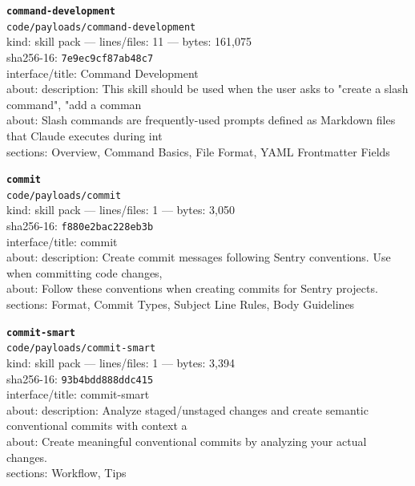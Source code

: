 \noindent\textbf{\texttt{command-development}}\\
\texttt{code/payloads/command-development}\\
kind: skill pack --- lines/files: 11 --- bytes: 161,075\\
sha256-16: \texttt{7e9ec9cf87ab48c7}\\
interface/title: Command Development\\
about: description: This skill should be used when the user asks to "create a slash command", "add a comman\\
about: Slash commands are frequently-used prompts defined as Markdown files that Claude executes during int\\
sections: Overview, Command Basics, File Format, YAML Frontmatter Fields\\
\vspace*{6.0pt}

\noindent\textbf{\texttt{commit}}\\
\texttt{code/payloads/commit}\\
kind: skill pack --- lines/files: 1 --- bytes: 3,050\\
sha256-16: \texttt{f880e2bac228eb3b}\\
interface/title: commit\\
about: description: Create commit messages following Sentry conventions. Use when committing code changes, \\
about: Follow these conventions when creating commits for Sentry projects.\\
sections: Format, Commit Types, Subject Line Rules, Body Guidelines\\
\vspace*{6.0pt}

\noindent\textbf{\texttt{commit-smart}}\\
\texttt{code/payloads/commit-smart}\\
kind: skill pack --- lines/files: 1 --- bytes: 3,394\\
sha256-16: \texttt{93b4bdd888ddc415}\\
interface/title: commit-smart\\
about: description: Analyze staged/unstaged changes and create semantic conventional commits with context a\\
about: Create meaningful conventional commits by analyzing your actual changes.\\
sections: Workflow, Tips\\
\vspace*{6.0pt}
\newpage

